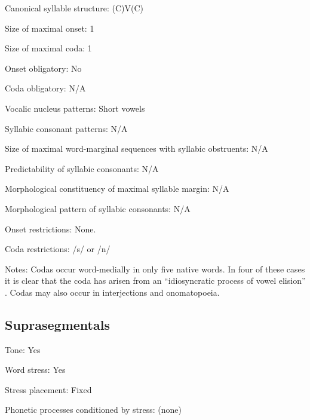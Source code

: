{\begin{appendixdesc}
\item[Canonical syllable structure:] (C)V(C) \citep[30--32]{Guillaume2008}

\item[Size of maximal onset:] 1

\item[Size of maximal coda:] 1

\item[Onset obligatory:] No

\item[Coda obligatory:] N/A

\item[Vocalic nucleus patterns:] Short vowels

\item[Syllabic consonant patterns:] N/A

\item[Size of maximal word-marginal sequences with syllabic obstruents:] N/A

\item[Predictability of syllabic consonants:] N/A

\item[Morphological constituency of maximal syllable margin:] N/A

\item[Morphological pattern of syllabic consonants:] N/A

\item[Onset restrictions:] None.

\item[Coda restrictions:] /s/ or /n/

\item[Notes:] Codas occur word-medially in only five native words. In four of these cases it is clear that the coda has arisen from an “idiosyncratic process of vowel elision” \citep[31]{Guillaume2008}. Codas may also occur in interjections and onomatopoeia.
\end{appendixdesc}
\subsection*{Suprasegmentals}
\begin{appendixdesc}
\item[Tone:] Yes

\item[Word stress:] Yes

\item[Stress placement:] Fixed

\item[Phonetic processes conditioned by stress:] (none)


\end{appendixdesc}}
